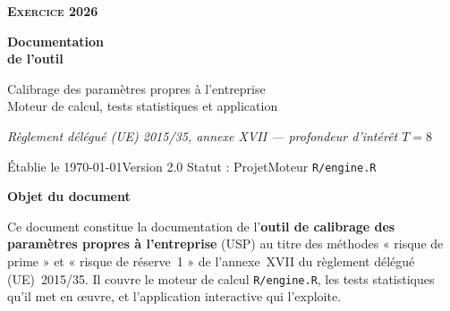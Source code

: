 \documentclass[a4paper,11pt]{article}
\newcommand{\annee}{2026}
\newcommand{\datedoc}{\today}
\newcommand{\versiondoc}{2.0}
\newcommand{\statutdoc}{Projet}
\newcommand{\titrebandeau}[1]{%
  \noindent{\color{financeblue}\rule{\linewidth}{2.5pt}}
  \par\vspace{5mm}
  {\color{greenline}\raggedright\fontsize{19}{23}\bfseries\selectfont #1\par}
  \vspace{6mm}}
\newcommand{\code}[1]{\texttt{\small #1}}
\begin{document}
\thispagestyle{empty}
%
\vspace*{2.1cm}
\noindent
{\color{financeblue}\normalsize\bfseries\scshape Exercice \annee}

\vspace{1.7cm}
\noindent
{\color{financeblue}\fontsize{28}{34}\bfseries\selectfont
 Documentation\\ de l'outil\par}

\vspace{1.1cm}
\noindent
{\color{black}\Large
 Calibrage des paramètres propres à l'entreprise\\
 Moteur de calcul, tests statistiques et application\par}

\vspace{0.7cm}
\noindent
{\color{black}\normalsize\itshape
 Règlement délégué (UE) 2015/35, annexe XVII --- profondeur d'intérêt $T = 8$\par}

\vfill
\noindent
{\footnotesize\color{black}
 Établie le \datedoc\quad\textbar\quad Version \versiondoc\quad\textbar\quad
 Statut : \statutdoc\quad\textbar\quad Moteur \code{R/engine.R}\par}
\vspace{2.6cm}
\clearpage

\titrebandeau{Objet du document}

\noindent
Ce document constitue la documentation de l'\textbf{outil de calibrage des
paramètres propres à l'entreprise} (USP) au titre des méthodes « risque de
prime » et « risque de réserve~1 » de l'annexe~XVII du règlement délégué
(UE)~2015/35. Il couvre le moteur de calcul \code{R/engine.R}, les tests
statistiques qu'il met en \oe uvre, et l'application interactive qui l'exploite.
\end{document}
